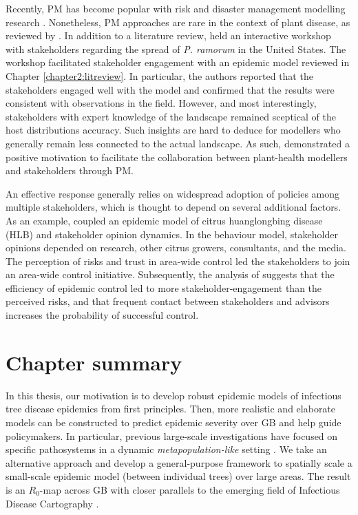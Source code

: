 Recently, PM has become popular with risk and disaster management modelling research \cite{hamalainen2020leadership, ravera2020participatory, hedelin2017participatory}.
Nonetheless, PM approaches are rare in the context of plant disease, as reviewed by \cite{gaydos2019forecasting}.
In addition to a literature review, \cite{gaydos2019forecasting} held an interactive workshop with stakeholders
regarding the spread of \textit{P. ramorum} in the United States. The workshop facilitated stakeholder engagement
with an epidemic model \cite{tonini2017tangible}\textemdash reviewed in Chapter \ref{chapter2:litreview}. In particular, the authors reported
that the stakeholders engaged well with the model and confirmed that the results were consistent with observations in the field. However, and most interestingly, stakeholders with expert knowledge of the landscape remained sceptical of the host distributions accuracy. 
Such insights are hard to deduce for modellers who generally remain less connected to the actual landscape. 
As such, \cite{tonini2017tangible} demonstrated a positive motivation to facilitate the collaboration 
between plant-health modellers and stakeholders through PM.

An effective response generally relies on widespread adoption of policies among multiple 
stakeholders, which is thought to depend on several additional factors. As an example, \cite{milne2020makes} coupled
an epidemic model of citrus huanglongbing disease (HLB) and stakeholder opinion dynamics. In the behaviour model, stakeholder
opinions depended on research, other citrus growers, consultants, and the media. The perception of risks and trust in
area-wide control led the stakeholders to join an area-wide control initiative. Subsequently, the analysis of 
\cite{milne2020makes} suggests that the efficiency of epidemic control led to more stakeholder-engagement than the perceived risks, and that frequent contact between stakeholders and advisors increases the probability of successful control.

\section{Chapter summary}

In this thesis, our motivation is to develop robust epidemic models of infectious tree disease
epidemics from first principles. Then, more realistic and elaborate models can be constructed to
predict epidemic severity over GB and help guide policymakers. 
In particular, previous large-scale investigations
have focused on specific pathosystems in a dynamic \textit{metapopulation-like} setting
\cite{large-scale-control, meentemeyer2011epidemiological, harwood2009epidemiological}. We take
an alternative approach and develop a general-purpose framework to spatially scale a small-scale epidemic
model (between individual trees) over large areas. The result is an $R_0$-map across GB with closer parallels
to the emerging field of Infectious Disease Cartography \cite{otieno2021modeling, KRAEMER201619, messina2016mapping}.

